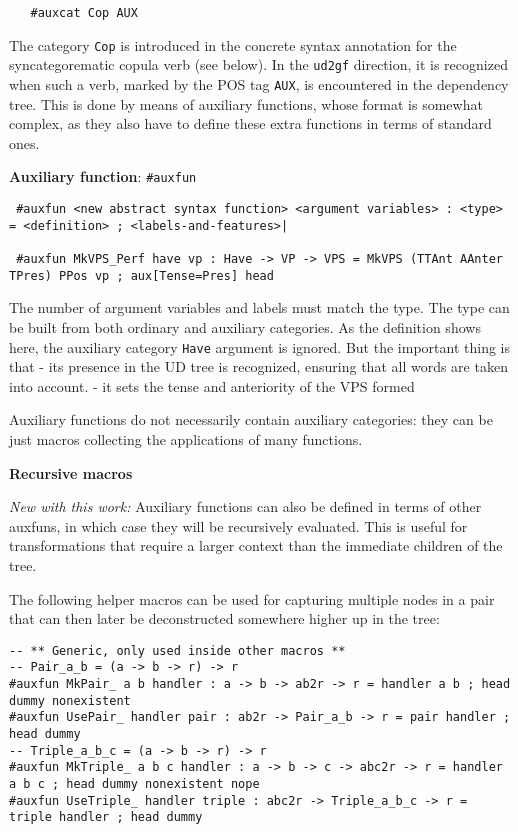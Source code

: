 \begin{verbatim}
   #auxcat Cop AUX
\end{verbatim}

The category \texttt{Cop} is introduced in the concrete syntax
annotation for the syncategorematic copula verb (see below). In the
\texttt{ud2gf} direction, it is recognized when such a verb, marked by
the POS tag \texttt{AUX}, is encountered in the dependency tree. This is
done by means of auxiliary functions, whose format is somewhat complex,
as they also have to define these extra functions in terms of standard
ones.

\textbf{Auxiliary function}: \texttt{\#auxfun}


\begin{lstlisting}
 #auxfun <new abstract syntax function> <argument variables> : <type> = <definition> ; <labels-and-features>|

 #auxfun MkVPS_Perf have vp : Have -> VP -> VPS = MkVPS (TTAnt AAnter TPres) PPos vp ; aux[Tense=Pres] head
\end{lstlisting}

The number of argument variables and labels must match the type. The
type can be built from both ordinary and auxiliary categories. As the
definition shows here, the auxiliary category \texttt{Have} argument is
ignored. But the important thing is that - its presence in the UD tree
is recognized, ensuring that all words are taken into account. - it sets
the tense and anteriority of the VPS formed

Auxiliary functions do not necessarily contain auxiliary categories:
they can be just macros collecting the applications of many functions.



\textbf{Recursive macros}

\emph{New with this work:} Auxiliary functions can also be defined in terms of other auxfuns, in which case they will be recursively evaluated. This is useful for transformations that require a larger context than the immediate children of the tree.

The following helper macros can be used for capturing multiple nodes in a pair that can then later be deconstructed somewhere higher up in the tree:

\begin{lstlisting}
-- ** Generic, only used inside other macros **
-- Pair_a_b = (a -> b -> r) -> r
#auxfun MkPair_ a b handler : a -> b -> ab2r -> r = handler a b ; head dummy nonexistent
#auxfun UsePair_ handler pair : ab2r -> Pair_a_b -> r = pair handler ; head dummy
-- Triple_a_b_c = (a -> b -> r) -> r
#auxfun MkTriple_ a b c handler : a -> b -> c -> abc2r -> r = handler a b c ; head dummy nonexistent nope
#auxfun UseTriple_ handler triple : abc2r -> Triple_a_b_c -> r = triple handler ; head dummy
\end{lstlisting}

